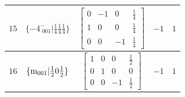 \documentclass[fleqn,8pt]{jsarticle}
\begin{document}
\begin{longtable}{ccccc}
$ 15 $ & $ \{-4^{-}_{\,\,001}|\frac{1}{4} \frac{1}{4} \frac{1}{4}\} $ & $ \begin{bmatrix} 0 & -1 & 0 & \frac{1}{4} \\ 1 & 0 & 0 & \frac{1}{4} \\ 0 & 0 & -1 & \frac{1}{4} \end{bmatrix} $ & $ -1 $ & $ 1 $ \\ \hline
$ 16 $ & $ \{{\rm m}_{001}|\frac{1}{2} 0 \frac{1}{2}\} $ & $ \begin{bmatrix} 1 & 0 & 0 & \frac{1}{2} \\ 0 & 1 & 0 & 0 \\ 0 & 0 & -1 & \frac{1}{2} \end{bmatrix} $ & $ -1 $ & $ 1 $ \\
\end{longtable}
\end{document}
